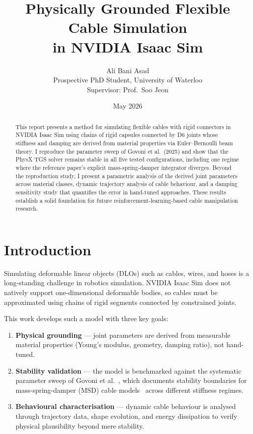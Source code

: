 \documentclass[11pt,a4paper]{article}
\title{Physically Grounded Flexible Cable Simulation\\in NVIDIA Isaac Sim}
\author{Ali Bani Asad\\[4pt]
\small Prospective PhD Student, University of Waterloo\\
\small Supervisor: Prof.\ Soo Jeon}
\date{May 2026}
\begin{document}
\maketitle

\begin{abstract}
This report presents a method for simulating flexible cables with rigid connectors
in NVIDIA Isaac Sim using chains of rigid capsules connected by D6 joints whose
stiffness and damping are derived from material properties via Euler--Bernoulli
beam theory. I reproduce the parameter sweep of Govoni et al.\ (2025) and show
that the PhysX TGS solver remains stable in all five tested configurations,
including one regime where the reference paper's explicit mass-spring-damper
integrator diverges. Beyond the reproduction study, I present a parametric
analysis of the derived joint parameters across material classes, dynamic
trajectory analysis of cable behaviour, and a damping sensitivity study
that quantifies the error in hand-tuned approaches. These results establish
a solid foundation for future reinforcement-learning-based cable manipulation
research.
\end{abstract}


\section{Introduction}

Simulating deformable linear objects (DLOs) such as cables, wires, and hoses
is a long-standing challenge in robotics simulation.  NVIDIA Isaac Sim does not
natively support one-dimensional deformable bodies, so cables must be
approximated using chains of rigid segments connected by constrained joints.

This work develops such a model with three key goals:
\begin{enumerate}[nosep]
    \item \textbf{Physical grounding} --- joint parameters are derived from
          measurable material properties (Young's modulus, geometry, damping
          ratio), not hand-tuned.
    \item \textbf{Stability validation} --- the model is benchmarked against the
          systematic parameter sweep of Govoni et al.~\cite{govoni2025},
          which documents stability boundaries for mass-spring-damper (MSD)
          cable models~\cite{lv2017} across different stiffness regimes.
    \item \textbf{Behavioural characterisation} --- dynamic cable behaviour is
          analysed through trajectory data, shape evolution, and energy
          dissipation to verify physical plausibility beyond mere stability.
\end{enumerate}
\end{document}
